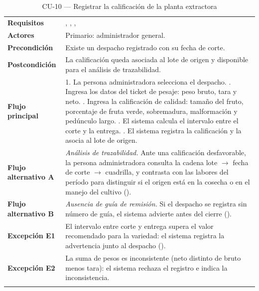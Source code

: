 \begin{longtable}{|L{3.4cm}|L{12.0cm}|}
\hline
{}\\
\hline
\textbf{Requisitos} & , , ,  \\ \hline
\textbf{Actores} & Primario: administrador general. \\ \hline
\textbf{Precondición} & Existe un despacho registrado con su fecha de corte. \\ \hline
\textbf{Postcondición} & La calificación queda asociada al lote de origen y disponible para el análisis de trazabilidad. \\ \hline
\textbf{Flujo principal} & 1. La persona administradora selecciona el despacho. . Ingresa los datos del ticket de pesaje: peso bruto, tara y neto. . Ingresa la calificación de calidad: tamaño del fruto, porcentaje de fruta verde, sobremadura, malformación y pedúnculo largo. . El sistema calcula el intervalo entre el corte y la entrega. . El sistema registra la calificación y la asocia al lote de origen. \\ \hline
\textbf{Flujo alternativo A} & \emph{Análisis de trazabilidad.} Ante una calificación desfavorable, la persona administradora consulta la cadena lote $\rightarrow$ fecha de corte $\rightarrow$ cuadrilla, y contrasta con las labores del período para distinguir si el origen está en la cosecha o en el manejo del cultivo (). \\ \hline
\textbf{Flujo alternativo B} & \emph{Ausencia de guía de remisión.} Si el despacho se registra sin número de guía, el sistema advierte antes del cierre (). \\ \hline
\textbf{Excepción E1} & El intervalo entre corte y entrega supera el valor recomendado para la variedad: el sistema registra la advertencia junto al despacho (). \\ \hline
\textbf{Excepción E2} & La suma de pesos es inconsistente (neto distinto de bruto menos tara): el sistema rechaza el registro e indica la inconsistencia. \\ \hline
\caption{CU-10 --- Registrar la calificación de la planta extractora}
\end{longtable}

